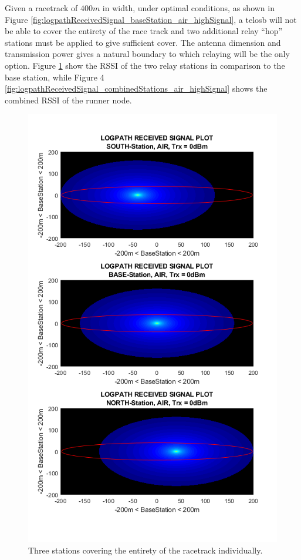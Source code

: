 Given a racetrack of $400m$ in width, under optimal conditions, as shown in Figure \ref{fig:logpathReceivedSignal_baseStation_air_highSignal}, a telosb will not be able to cover the entirety of the race track and two additional relay “hop” stations must be applied to give sufficient cover. The antenna dimension and transmission power gives a natural boundary to which relaying will be the only option. Figure \ref{fig:logpathReceivedSignal_eachStation_air_highSignal} show the RSSI of the two relay stations in comparison to the base station, while Figure 4 \ref{fig:logpathReceivedSignal_combinedStations_air_highSignal} shows the combined RSSI of the runner node.

\begin{figure}[H]
	\centering
	\includegraphics[width=\linewidth]{theory/pathLoss/fig/logpathReceivedSignal_eachStation_air_highSignal.png}
	\caption{Three stations covering the entirety of the racetrack individually.}
	\label{fig:logpathReceivedSignal_eachStation_air_highSignal}
\end{figure}


